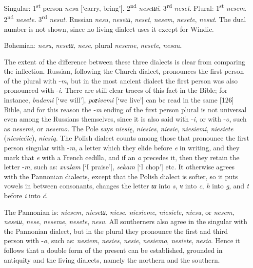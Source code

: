 Singular: 1\textsuperscript{st} person \textit{nesu} [‘carry, bring’]. 2\textsuperscript{nd} \textit{neseшi}. 3\textsuperscript{rd} \textit{neset}. Plural: 1\textsuperscript{st} \textit{nesem}. 2\textsuperscript{nd} \textit{nesete}. 3\textsuperscript{rd} \textit{nesut}. Russian \textit{nesu}, \textit{neseш}, \textit{neset}, \textit{nesem}, \textit{nesete}, \textit{nesut}. The dual number is not shown, since no living dialect uses it except for Windic.

Bohemian: \textit{nesu}, \textit{neseш}, \textit{nese}, plural \textit{neseme}, \textit{nesete}, \textit{nesau}.

The extent of the difference between these three dialects is clear from comparing the inflection. Russian, following the Church dialect, pronounces the first person of the plural with -\textit{m}, but in the most ancient dialect the first person was also pronounced with -\textit{i}. There are still clear traces of this fact in the Bible; for instance, \textit{budemi} [‘we will’], \textit{poƶivemi} [‘we live’] can be read in the same [126] Bible, and for this reason the -\textit{m} ending of the first person plural is not universal even among the Russians themselves, since it is also said with -\textit{i}, or with -\textit{o}, such as \textit{nesemi}, or \textit{nesemo}. The Pole says \textit{niesię}, \textit{niesies}, \textit{niesie}, \textit{niesiemi}, \textit{niesiete} (\textit{niesiećie}), \textit{niesią}. The Polish dialect counts among those that pronounce the first person singular with -\textit{m}, a letter which they elide before \textit{e} in writing, and they mark that \textit{e} with a French cedilla, and if an \textit{a} precedes it, then they retain the letter -\textit{m}, such as: \textit{xvalam} [‘I praise’], \textit{sekam} [‘I chop’] etc. It otherwise agrees with the Pannonian dialects, except that the Polish dialect is softer, so it puts vowels in between consonants, changes the letter \textit{ш} into \textit{s}, \textit{ч} into \textit{c}, \textit{h} into \textit{g}, and \textit{t} before \textit{i} into \textit{ć}.

The Pannonian is: \textit{niesem}, \textit{nieseш}, \textit{niese}, \textit{niesieme}, \textit{niesiete}, \textit{niesu}, or \textit{nesem}, \textit{neseш}, \textit{nese}, \textit{neseme}, \textit{nesete}, \textit{nesu}. All southerners also agree in the singular with the Pannonian dialect, but in the plural they pronounce the first and third person with -\textit{o}, such as: \textit{nesiem}, \textit{nesies}, \textit{nesie}, \textit{nesiemo}, \textit{nesiete}, \textit{nesio}. Hence it follows that a double form of the present can be established, grounded in antiquity and the living dialects, namely the northern and the southern.

